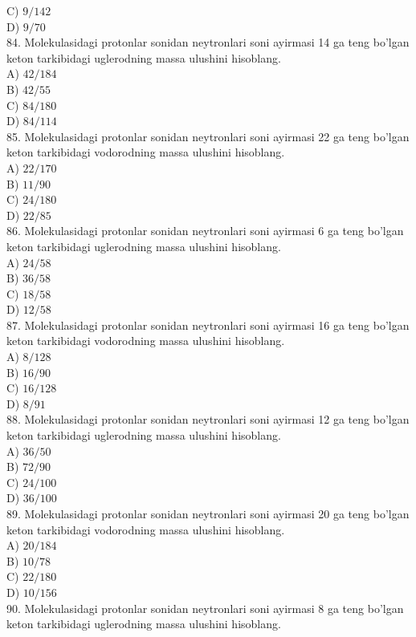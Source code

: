 C) $9 / 142$\\
D) $9 / 70$\\
84. Molekulasidagi protonlar sonidan neytronlari soni ayirmasi 14 ga teng bo'lgan keton tarkibidagi uglerodning massa ulushini hisoblang.\\
A) $42 / 184$\\
B) $42 / 55$\\
C) $84 / 180$\\
D) $84 / 114$\\
85. Molekulasidagi protonlar sonidan neytronlari soni ayirmasi 22 ga teng bo'lgan keton tarkibidagi vodorodning massa ulushini hisoblang.\\
A) $22 / 170$\\
B) $11 / 90$\\
C) $24 / 180$\\
D) $22 / 85$\\
86. Molekulasidagi protonlar sonidan neytronlari soni ayirmasi 6 ga teng bo'lgan keton tarkibidagi uglerodning massa ulushini hisoblang.\\
A) $24 / 58$\\
B) $36 / 58$\\
C) $18 / 58$\\
D) $12 / 58$\\
87. Molekulasidagi protonlar sonidan neytronlari soni ayirmasi 16 ga teng bo'lgan keton tarkibidagi vodorodning massa ulushini hisoblang.\\
A) $8 / 128$\\
B) $16 / 90$\\
C) $16 / 128$\\
D) $8 / 91$\\
88. Molekulasidagi protonlar sonidan neytronlari soni ayirmasi 12 ga teng bo'lgan keton tarkibidagi uglerodning massa ulushini hisoblang.\\
A) $36 / 50$\\
B) $72 / 90$\\
C) $24 / 100$\\
D) $36 / 100$\\
89. Molekulasidagi protonlar sonidan neytronlari soni ayirmasi 20 ga teng bo'lgan keton tarkibidagi vodorodning massa ulushini hisoblang.\\
A) $20 / 184$\\
B) $10 / 78$\\
C) $22 / 180$\\
D) $10 / 156$\\
90. Molekulasidagi protonlar sonidan neytronlari soni ayirmasi 8 ga teng bo'lgan keton tarkibidagi uglerodning massa ulushini hisoblang.\\
